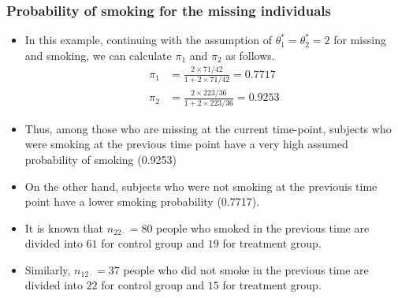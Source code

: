 \documentclass{beamer}
\begin{document}
\begin{frame}
\frametitle{Probability of smoking for the missing individuals}
\begin{itemize}
\item In this example, continuing with the assumption of $\theta_{1}^* = \theta_{2}^* = 2$ for missing and smoking, we can calculate $\pi_1$ and $\pi_2$ as follows.
\begin{align}
\pi_{1} &= \frac{2\times 71/42}{1 + 2\times 71/42} = 0.7717 \\
\pi_{2} &= \frac{2\times 223/36}{1 + 2\times 223/36} =0.9253 \nonumber
\end{align}
\item Thus, among those who are missing at the current time-point, subjects who were smoking at the previous time point have a very high assumed probability of smoking (0.9253)
\vspace{10pt}
\item On the other hand, subjects who were not smoking at the previouis time point have a lower smoking probability (0.7717).
\vspace{10pt}
\item It is known that $n_{22\cdot} = 80$ people who smoked in the previous time are divided into $61$ for control group and $19$ for treatment group.
\vspace{10pt}
\item Similarly, $n_{12\cdot} = 37$ people who did not smoke in the previous time are divided into $22$ for control group and $15$ for treatment group.
\end{itemize}
\end{frame}
\end{document}
